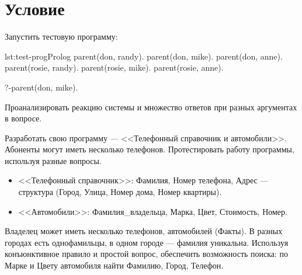 \section{Условие}
Запустить тестовую программу:
\begin{listing}{lst:test-prog}{Prolog}
parent(don, randy).
parent(don, mike).
parent(don, anne).
parent(rosie, randy).
parent(rosie, mike).
parent(rosie, anne).

?-parent(don, mike).
\end{listing}

Проанализировать реакцию системы и множество ответов при разных аргументах в вопросе.

Разработать свою программу --- <<Телефонный справочник и автомобили>>. Абоненты могут
иметь несколько телефонов. Протестировать работу программы, используя разные вопросы.
\begin{itemize}
    \item <<Телефонный справочник>>: Фамилия, Номер телефона, Адрес --- структура (Город, Улица, Номер дома, Номер квартиры).
    \item <<Автомобили>>: Фамилия\_владельца, Марка, Цвет, Стоимость, Номер.
\end{itemize}

Владелец может иметь несколько телефонов, автомобилей (Факты). В разных городах есть 
однофамильцы, в одном городе --- фамилия уникальна. Используя конъюнктивное правило и
простой вопрос, обеспечить возможность поиска: по Марке и Цвету автомобиля найти Фамилию, Город, Телефон.